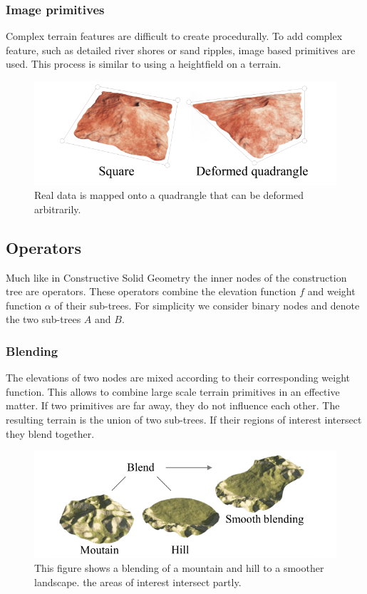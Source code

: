\subsubsection{Image primitives}
Complex terrain features are difficult to create procedurally. To add complex feature, such as detailed river shores or sand ripples, image based primitives are used. This process is similar to using a heightfield on a terrain. 

\begin{figure}[htb]
	\centering
	\includegraphics[width=.8\linewidth]{GGP15/image_primitive}
	\caption{Real data is mapped onto a quadrangle that can be deformed arbitrarily.}
	\label{fig:image_primitive}
\end{figure}


\subsection{Operators}
Much like in Constructive Solid Geometry the inner nodes of the construction tree are operators. These operators combine the elevation function $f$ and weight function $\alpha$ of their sub-trees. For simplicity we consider binary nodes and denote the two sub-trees $A$ and $B$. 

\subsubsection{Blending}
The elevations of two nodes are mixed according to their corresponding weight function. This allows to combine large scale terrain primitives in an effective matter. If two primitives are far away, they do not influence each other. The resulting terrain is the union of two sub-trees. If their regions of interest intersect they blend together.
\begin{figure}[htb]
	\centering
	\includegraphics[width=.8\linewidth]{GGP15/blend_operator}
	\caption{This figure shows a blending of a mountain and hill to a smoother landscape. the areas of interest intersect partly. }
	\label{fig:blend_operator}
\end{figure}
